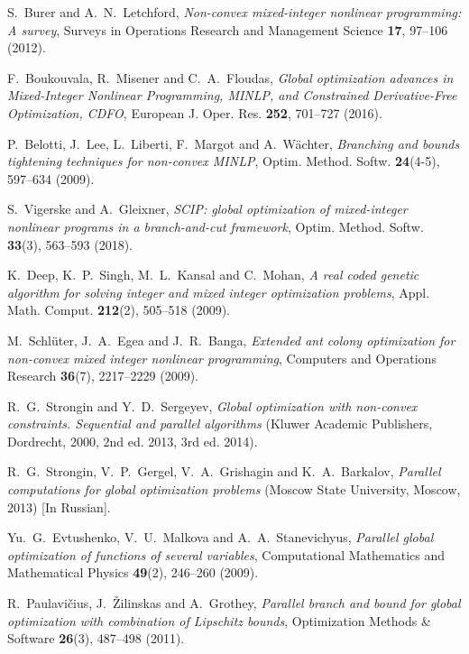 \documentclass[
11pt,%
tightenlines,%
twoside,%
onecolumn,%
nofloats,%
nobibnotes,%
nofootinbib,%
superscriptaddress,%
noshowpacs,%
centertags]%
{revtex4}
\begin{document}
%
%

\begin{thebibliography}{99}

S.~Burer and A.~N.~Letchford, \textit{Non-convex mixed-integer nonlinear programming: A survey}, Surveys in Operations Research and Management Science \textbf{17}, 97--106 (2012).

F.~Boukouvala, R.~Misener and C.~A.~Floudas, \textit{Global optimization advances in Mixed-Integer Nonlinear Programming, MINLP, and Constrained Derivative-Free Optimization, CDFO}, European J. Oper. Res. \textbf{252}, 701--727 (2016).

P.~Belotti, J.~Lee, L.~Liberti, F.~Margot and A.~W\"achter, \textit{Branching and bounds tightening techniques for non-convex MINLP}, Optim. Method. Softw. \textbf{24}(4-5), 597--634 (2009).

S.~Vigerske and A.~Gleixner, \textit{SCIP: global optimization of mixed-integer nonlinear programs in a branch-and-cut framework}, Optim. Method. Softw. \textbf{33}(3), 563--593 (2018).

K.~Deep, K.~P.~Singh, M.~L.~Kansal and C.~Mohan, \textit{A real coded genetic algorithm for solving integer and mixed integer optimization problems}, Appl. Math. Comput. \textbf{212}(2), 505--518 (2009).

M.~Schl\"uter, J.~A.~Egea and J.~R.~Banga, \textit{Extended ant colony optimization for non-convex mixed integer nonlinear programming}, Computers and Operations Research \textbf{36}(7), 2217--2229 (2009).

R.~G.~Strongin and Y.~D.~Sergeyev, \textit{Global optimization with non-convex constraints. Sequential and parallel algorithms} (Kluwer Academic Publishers, Dordrecht, 2000, 2nd ed. 2013, 3rd ed. 2014).

R.~G.~Strongin, V.~P.~Gergel, V.~A.~Grishagin and K.~A.~Barkalov, \textit{Parallel computations for global optimization problems} (Moscow State University, Moscow, 2013) [In Russian].

Yu.~G.~Evtushenko, V.~U.~Malkova and A.~A.~Stanevichyus, \textit{Parallel global optimization of functions of several variables}, Computational Mathematics and Mathematical Physics \textbf{49}(2), 246--260 (2009).

R.~Paulavi\v{c}ius, J.~\v{Z}ilinskas and A.~Grothey, \textit{Parallel branch and bound for global optimization with combination of Lipschitz bounds}, Optimization Methods \& Software \textbf{26}(3), 487--498 (2011).


\end{thebibliography}
\end{document}
